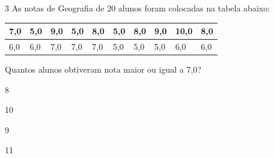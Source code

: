 





\num{3} As notas de Geografia de 20 alunos foram colocadas na tabela abaixo:


\begin{longtable}[]{@{}llllllllll@{}}
\toprule
7,0 & 5,0 & 9,0 & 5,0 & 8,0 & 5,0 & 8,0 & 9,0 & 10,0 &
8,0\tabularnewline
\midrule
\endhead
6,0 & 6,0 & 7,0 & 7,0 & 7,0 & 5,0 & 5,0 & 5,0 & 6,0 & 6,0\tabularnewline
\bottomrule
\end{longtable}

Quantos alunos obtiveram nota maior ou igual a 7,0?
\item 8
\item 10
\item 9
\item 11






